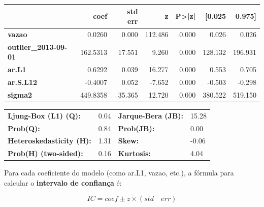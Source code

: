 \documentclass[ 12pt,a4paper ]{article} %
\begin{document}
\begin{table}[htbp]
	 	\begin{tabular}{lrrrrrr} %
	 		\toprule
	 		& \textbf{coef} & \textbf{std err} & \textbf{z} & \textbf{P>|z|} & \textbf{[0.025} & \textbf{0.975]} \\
	 		\midrule
	 		\textbf{vazao} & 0.0260 & 0.000 & 112.486 & 0.000 & 0.026 & 0.026 \\
	 		\textbf{outlier\_2013-09-01} & 162.5313 & 17.551 & 9.260 & 0.000 & 128.132 & 196.931 \\
	 		\textbf{ar.L1} & 0.6292 & 0.039 & 16.277 & 0.000 & 0.553 & 0.705 \\
	 		\textbf{ar.S.L12} & -0.4007 & 0.052 & -7.652 & 0.000 & -0.503 & -0.298 \\
	 		\textbf{sigma2} & 449.8358 & 35.365 & 12.720 & 0.000 & 380.522 & 519.150 \\
	 		\bottomrule
	 	\end{tabular}
	 	
	 	\medskip %
	 	
	 	\begin{tabular}{llll}
	 		\toprule
	 		\textbf{Ljung-Box (L1) (Q):} & 0.04 & \textbf{Jarque-Bera (JB):} & 15.28 \\
	 		\textbf{Prob(Q):}            & 0.84 & \textbf{Prob(JB):}         & 0.00 \\
	 		\textbf{Heteroskedasticity (H):} & 1.31 & \textbf{Skew:}             & -0.06 \\
	 		\textbf{Prob(H) (two-sided):} & 0.16 & \textbf{Kurtosis:}         & 4.04 \\
	 		\bottomrule
	 	\end{tabular}
	 	
	 	\medskip
	 	
	 	
	 \end{table}
	 
	 
	 Para cada coeficiente do modelo (como ar.L1, vazao, etc.), a fórmula para calcular o \textbf{intervalo de confiança} é:
	 
	 
	 $$IC=coef \pm z \times (std\quad err)$$
	 
\end{document}
